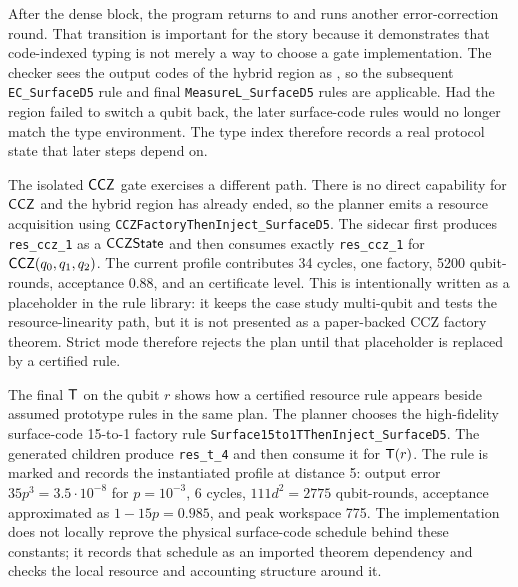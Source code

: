 After the dense block, the program returns to  and runs another error-correction round.
That transition is important for the story because it demonstrates that code-indexed typing is not merely a way to choose a gate implementation.
The checker sees the output codes of the hybrid region as , so the subsequent \texttt{EC\_SurfaceD5} rule and final \texttt{MeasureL\_SurfaceD5} rules are applicable.
Had the region failed to switch a qubit back, the later surface-code rules would no longer match the type environment.
The type index therefore records a real protocol state that later steps depend on.

The isolated $\mathsf{CCZ}$ gate exercises a different path.
There is no direct  capability for $\mathsf{CCZ}$ and the hybrid region has already ended, so the planner emits a resource acquisition using \texttt{CCZFactoryThenInject\_SurfaceD5}.
The sidecar first produces \texttt{res\_ccz\_1} as a $\mathsf{CCZState}$ and then consumes exactly \texttt{res\_ccz\_1} for $\mathsf{CCZ}(q_0,q_1,q_2)$.
The current profile contributes 34 cycles, one factory, 5200 qubit-rounds, acceptance $0.88$, and an \Assumed{} certificate level.
This is intentionally written as a placeholder in the rule library: it keeps the case study multi-qubit and tests the resource-linearity path, but it is not presented as a paper-backed CCZ factory theorem.
Strict mode therefore rejects the plan until that placeholder is replaced by a certified rule.

The final $\mathsf{T}$ on the qubit $r$ shows how a certified resource rule appears beside assumed prototype rules in the same plan.
The planner chooses the high-fidelity surface-code 15-to-1 factory rule \texttt{Surface15to1TThenInject\_SurfaceD5}.
The generated children produce \texttt{res\_t\_4} and then consume it for $\mathsf{T}(r)$.
The rule is marked \Certified{} and records the instantiated profile at distance 5: output error $35p^3=3.5\cdot 10^{-8}$ for $p=10^{-3}$, 6 cycles, $111d^2=2775$ qubit-rounds, acceptance approximated as $1-15p=0.985$, and peak workspace 775.
The implementation does not locally reprove the physical surface-code schedule behind these constants; it records that schedule as an imported theorem dependency and checks the local resource and accounting structure around it.

